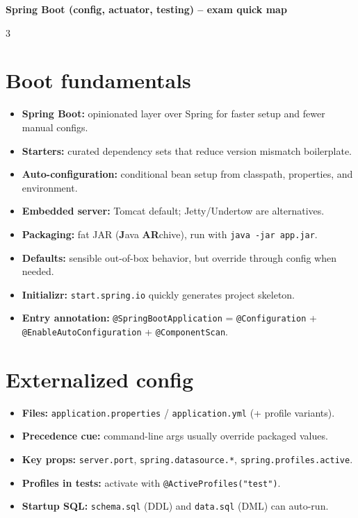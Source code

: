{\centering\bfseries Spring Boot (config, actuator, testing) -- exam quick map\par}
\vspace{0.35ex}
\begin{multicols}{3}
\raggedright
\small

\section*{Boot fundamentals}
\begin{itemize}[leftmargin=*, nosep, topsep=0pt]
  \item \textbf{Spring Boot:} opinionated layer over Spring for faster setup and fewer manual configs.
  \item \textbf{Starters:} curated dependency sets that reduce version mismatch boilerplate.
  \item \textbf{Auto-configuration:} conditional bean setup from classpath, properties, and environment.
  \item \textbf{Embedded server:} Tomcat default; Jetty/Undertow are alternatives.
  \item \textbf{Packaging:} fat JAR (\textbf{J}ava \textbf{AR}chive), run with \texttt{java -jar app.jar}.
  \item \textbf{Defaults:} sensible out-of-box behavior, but override through config when needed.
  \item \textbf{Initializr:} \texttt{start.spring.io} quickly generates project skeleton.
  \item \textbf{Entry annotation:} \texttt{@SpringBootApplication} = \texttt{@Configuration} + \texttt{@EnableAutoConfiguration} + \texttt{@ComponentScan}.
\end{itemize}

\section*{Externalized config}
\begin{itemize}[leftmargin=*, nosep, topsep=0pt]
  \item \textbf{Files:} \texttt{application.properties} / \texttt{application.yml} (+ profile variants).
  \item \textbf{Precedence cue:} command-line args usually override packaged values.
  \item \textbf{Key props:} \texttt{server.port}, \texttt{spring.datasource.*}, \texttt{spring.profiles.active}.
  \item \textbf{Profiles in tests:} activate with \texttt{@ActiveProfiles("test")}.
  \item \textbf{Startup SQL:} \texttt{schema.sql} (DDL) and \texttt{data.sql} (DML) can auto-run.
\end{itemize}


\end{multicols}
